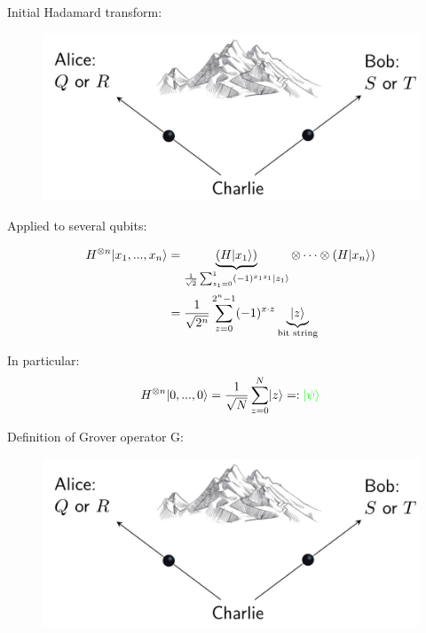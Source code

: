 Initial Hadamard transform: \\

\begin{figure}[H]
    \centering
    \includegraphics[scale=0.5]{chapters/res/alice-bob-charlie-mountain.png}
    \caption{}
\end{figure}

Applied to several qubits:

\begin{align}
    H^{\otimes n} \lvert x_1, ..., x_n\rangle 
        &= \underbrace{(H\lvert x_1\rangle)}_{\frac{1}{\sqrt{2}} \sum_{z_1 = 0}^1 (-1)^{x_1 z_1} \lvert z_1\rangle}
            \otimes \cdots \otimes (H \lvert x_n\rangle) \\ 
        &= \frac{1}{\sqrt{2^n}}  \sum_{z = 0}^{2^n - 1} (-1)^{x \cdot z} \underbrace{\lvert z\rangle}_{\text{bit string}}
\end{align}

In particular: 
\begin{equation}
    H^{\otimes n} \lvert0, ..., 0\rangle = \frac{1}{\sqrt{N}} \sum_{z = 0}^{N} \lvert z\rangle =: \color{green} \lvert\psi\rangle
\end{equation}

Definition of Grover operator G:

\begin{figure}[H]
    \centering
    \includegraphics[scale=0.5]{chapters/res/alice-bob-charlie-mountain.png}
    \caption{}
\end{figure}

